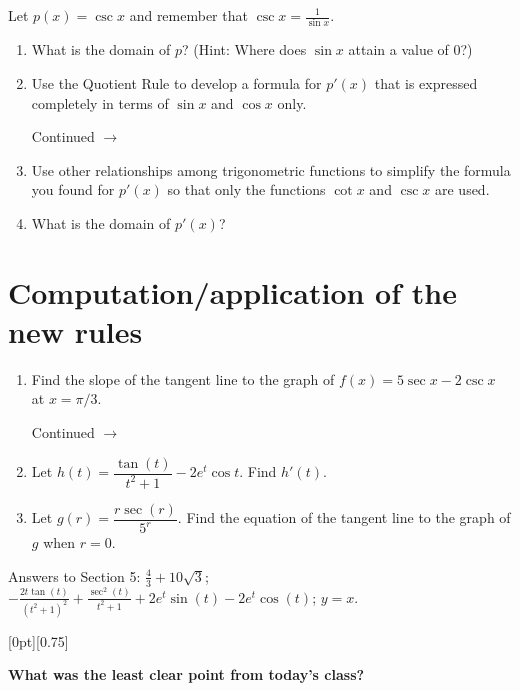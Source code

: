 \documentclass[11pt]{article}
\newcommand{\cuthere}{%
\noindent
\raisebox{-2.8pt}[0pt][0.75\baselineskip]{\small\ding{34}}
\unskip{\tiny\dotfill}
}
\def\ra{\rightarrow}
\def\pageturn{\vfill 
\begin{flushright}
	\begin{small}
		Continued $\ra$
	\end{small}
\end{flushright} \newpage}
\begin{document}
Let $p(x) = \csc x$ and remember that $\csc x = \frac{1}{\sin x}$. 
\begin{enumerate}
	\item What is the domain of $p$? (Hint: Where does $\sin x$ attain a value of $0$?)
	
	\vspace{0.5in}
	\item Use the Quotient Rule to develop a formula for $p'(x)$ that is expressed completely in terms of $\sin x$ and $\cos x$ only. 
	\pageturn
	\item Use other relationships among trigonometric functions to simplify the formula you found for $p'(x)$ so that only the functions $\cot x$ and $\csc x$ are used. 
	
	
	\vspace{1.5in}
	
	\item What is the domain of $p'(x)$? 
	
	\vspace{0.5in}
\end{enumerate}

\section{Computation/application of the new rules}

\begin{enumerate}
	\item Find the slope of the tangent line to the graph of $f(x) = 5 \sec x - 2 \csc x$ at $x = \pi/3$. 
	
\pageturn
	
	\item Let $h(t) = \dfrac{\tan(t)}{t^2 + 1} - 2e^t \cos t$. Find $h'(t)$. 
	
	\vspace{3in}
	
	\item Let $g(r) = \dfrac{r \sec(r)}{5^r}$. Find the equation of the tangent line to the graph of $g$ when $r = 0$. 
\end{enumerate}

\vfill

\begin{small}
	Answers to Section 5: $\frac{4}{3} + 10 \sqrt{3}$; $-\frac{2 t \tan (t)}{\left(t^2+1\right)^2}+\frac{\sec ^2(t)}{t^2+1}+2 e^t \sin (t)-2 e^t \cos (t)$; $y = x$. 
\end{small}


\cuthere

\noindent
\textbf{What was the least clear point from today's class?}

\vspace{1in}
\end{document}
